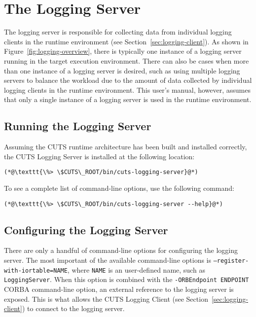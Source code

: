 \section{The Logging Server}
\label{sec:logging-server}

The logging server is responsible for collecting data from individual 
logging clients in the runtime environment (see Section~\ref{sec:logging-client}).
As shown in Figure~\ref{fig:logging-overview}, there is typically 
one instance of a logging server running in the target execution 
environment. There can also be cases when more than one instance of a 
logging server is desired, such as using multiple logging servers to 
balance the workload due to the amount of data collected by individual
logging clients in the runtime environment. This user's manual, however, 
assumes that only a single instance of a logging server is used in the 
runtime environment.

\subsection{Running the Logging Server}

Assuming the CUTS runtime architecture has been built and installed 
correctly, the CUTS Logging Server is installed at the following 
location:
\begin{lstlisting}
(*@\texttt{\%> \$CUTS\_ROOT/bin/cuts-logging-server}@*)
\end{lstlisting}
To see a complete list of command-line options, use the following 
command:
\begin{lstlisting}
(*@\texttt{\%> \$CUTS\_ROOT/bin/cuts-logging-server --help}@*)
\end{lstlisting}

\subsection{Configuring the Logging Server}
\label{sec:logging-server-config}

There are only a handful of command-line options for configuring the
logging server. The most important of the available command-line options
is \texttt{--register-with-iortable=NAME}, where \texttt{NAME} 
is an user-defined name, such as \texttt{LoggingServer}. When this 
option is combined with the \texttt{-ORBEndpoint ENDPOINT} CORBA 
command-line option, an external reference to the logging server is 
exposed. This is what allows the CUTS Logging Client (see 
Section~\ref{sec:logging-client}) to connect to the logging server.

